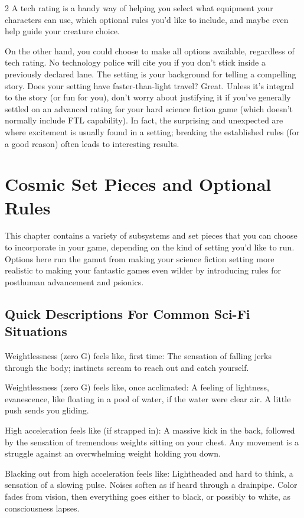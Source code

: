 \begin{multicols}{2}
A tech rating is a handy way of helping you select what equipment your characters can use, which optional rules you’d like to include, and maybe even help guide your creature choice.

On the other hand, you could choose to make all options available, regardless of tech rating. No technology police will cite you if you don’t stick inside a previously declared lane. The setting is your background for telling a compelling story. Does your setting have faster-than-light travel? Great. Unless it’s integral to the story (or fun for you), don’t worry about justifying it if you’ve generally settled on an advanced rating for your hard science fiction game (which doesn’t normally include FTL capability). In fact, the surprising and unexpected are where excitement is usually found in a setting; breaking the established rules (for a good reason) often leads to interesting results.

\section{Cosmic Set Pieces and Optional Rules}

This chapter contains a variety of subsystems and set pieces that you can choose to incorporate in your game, depending on the kind of setting you’d like to run. Options here run the gamut from making your science fiction setting more realistic to making your fantastic games even wilder by introducing rules for posthuman advancement and psionics.

\subsection{Quick Descriptions For Common Sci-Fi Situations}

Weightlessness (zero G) feels like, first time: The sensation of falling jerks through the body; instincts scream to reach out and catch yourself. 

Weightlessness (zero G) feels like, once acclimated: A feeling of lightness, evanescence, like floating in a pool of water, if the water were clear air. A little push sends you gliding. 

High acceleration feels like (if strapped in): A massive kick in the back, followed by the sensation of tremendous weights sitting on your chest. Any movement is a struggle against an overwhelming weight holding you down. 

Blacking out from high acceleration feels like: Lightheaded and hard to think, a sensation of a slowing pulse. Noises soften as if heard through a drainpipe. Color fades from vision, then everything goes either to black, or possibly to white, as consciousness lapses. 


\end{multicols}
